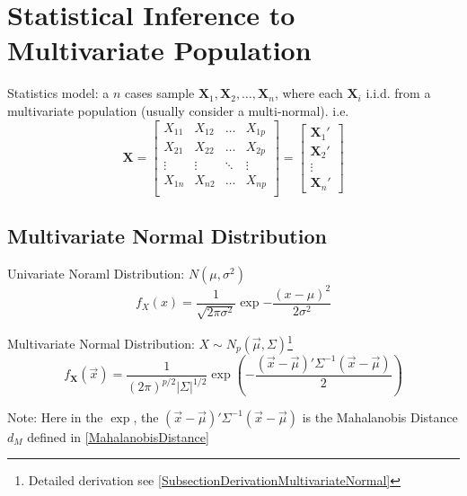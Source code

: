 \section{Statistical Inference to Multivariate Population}
    Statistics model: a $ n $ cases sample $ \mathbf{X}_1,\mathbf{X}_2,\ldots,\mathbf{X}_n $, where each $ \mathbf{X}_i $ i.i.d. from a multivariate population (usually consider a multi-normal). i.e.
    \begin{equation}\label{EqaNPSampleMatrixNotation}
        \mathbf{X}=\begin{bmatrix}
            X_{11}&X_{12}&\ldots&X_{1p}\\
            X_{21}&X_{22}&\ldots&X_{2p}\\
            \vdots&\vdots&\ddots&\vdots\\
            X_{1n}&X_{n2}&\ldots&X_{np}\\
            \end{bmatrix} 
            =
            \begin{bmatrix}
                \mathbf{X}_1'\\
                \mathbf{X}_2'\\
                \vdots\\
                \mathbf{X}_n'
            \end{bmatrix}
    \end{equation}



\subsection{Multivariate Normal Distribution}\label{SubSubSectionMultivariateNormalDistribution}
    Univariate Noraml Distribution: $ N(\mu,\sigma^2) $
    \begin{equation}
        f_X(x)=\dfrac{1}{\sqrt{2\pi\sigma ^2}}\exp{-\dfrac{(x-\mu)^2}{2\sigma ^2}} 
    \end{equation}
    
    Multivariate Normal Distribution: $X\sim N_p(\vec{\mu},\Sigma) $\footnote{Detailed derivation see \autoref{SubsectionDerivationMultivariateNormal}}
    \begin{equation}
        f_\mathbf{X}(\vec{x})=\dfrac{1}{(2\pi)^{p/2}|\Sigma |^{1/2}}\exp\left({-\dfrac{(\vec{x}-\vec{\mu})'\Sigma^{-1}(\vec{x}-\vec{\mu})}{2}} \right)
    \end{equation}

    Note: Here in the $ \exp $, the $ (\vec{x}-\vec{\mu})'\Sigma^{-1}(\vec{x}-\vec{\mu}) $ is the Mahalanobis Distance $ d_M $ defined in \autoref{MahalanobisDistance}

